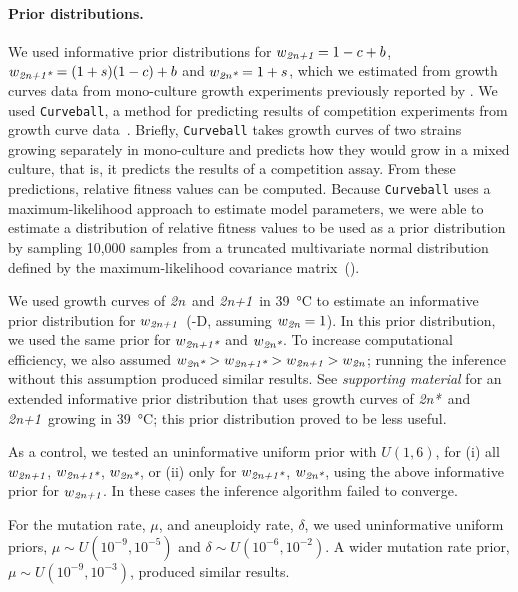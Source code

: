 \documentclass[12pt]{extarticle}
\newcommand{\euwt}{\emph{2n}}
\newcommand{\anwt}{\emph{2n+1}}
\newcommand{\eumt}{\emph{2n*}}
\newcommand{\anmt}{\emph{2n+1*}}
\begin{document}
\paragraph{Prior distributions.} \label{par:prior}
We used informative prior distributions for $w_{\anwt}=1-c+b$, $w_{\anmt}=(1+s)(1-c)+b$ and $w_{\eumt}=1+s$, which we estimated from growth curves data from mono-culture growth experiments previously reported by \citet[Figs. 3C, 4A, and S2]{Yona2012}.
We used \texttt{Curveball}, a method for predicting results of competition experiments from growth curve data~\citep[\href{https://curveball.yoavram.com}{curveball.yoavram.com}]{Ram2019}. Briefly, \texttt{Curveball} takes growth curves of two strains growing separately in mono-culture and predicts how they would grow in a mixed culture, that is, it predicts the results of a competition assay.
From these predictions, relative fitness values can be computed. Because \texttt{Curveball} uses a maximum-likelihood approach to estimate model parameters, we were able to estimate a distribution of relative fitness values to be used as a prior distribution by sampling 10,000 samples from a truncated multivariate normal distribution defined by the maximum-likelihood covariance matrix~().

We used growth curves of \euwt\ and \anwt\ in \SI{39}{\celsius} to estimate an informative prior distribution for $w_{\anwt}$~(-D, assuming $w_{\euwt}=1$).
In this prior distribution, we used the same prior for $w_{\anmt}$ and $w_{\eumt}$. 
To increase computational efficiency, we also assumed $w_\eumt>w_\anmt>w_\anwt>w_\euwt$; running the inference without this assumption produced similar results.
See \emph{supporting material} for an extended informative prior distribution that uses growth curves of \eumt\ and \anwt\ growing in \SI{39}{\celsius}; this prior distribution proved to be less useful.

As a control, we tested an uninformative uniform prior with $\mathit{U}(1,6)$, for (i) all $w_{\anwt}$, $w_{\anmt}$, $w_{\eumt}$, or (ii) only for $w_{\anmt}$, $w_{\eumt}$, using the above informative prior for $w_{\anwt}$. In these cases the inference algorithm failed to converge.
 
For the mutation rate, $\mu$, and aneuploidy rate, $\delta$, we used uninformative uniform priors, $\mu \sim \mathit{U}(10^{-9},10^{-5})$ and $\delta \sim \mathit{U}(10^{-6},10^{-2})$. A wider mutation rate prior, $\mu \sim \mathit{U}(10^{-9},10^{-3})$, produced similar results.
\end{document}
